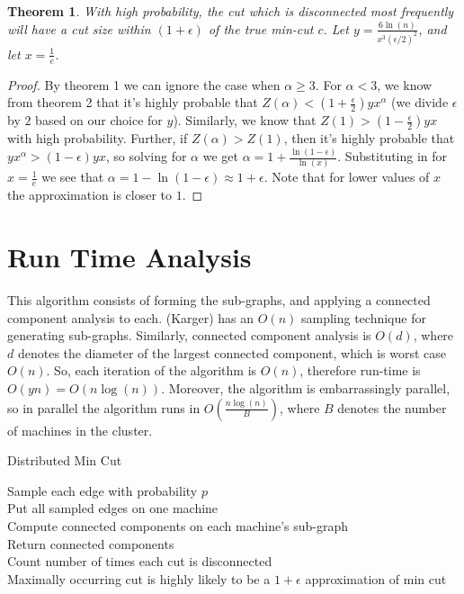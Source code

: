 \documentclass[12pt]{article}
\newtheorem{theorem}{Theorem}
\begin{document}
\begin{theorem}
With high probability, the cut which is disconnected most frequently will have a cut size within $(1+\epsilon)$ of the true min-cut $c$. Let $y = \frac{6 \ln(n)}{x^3 (\epsilon/2)^2}$, and let $x = \frac{1}{e}$.
\end{theorem}

\begin{proof}
By theorem 1 we can ignore the case when $\alpha \geq 3$. For $\alpha < 3$, we know from theorem 2 that it's highly probable that $Z(\alpha) < (1+\frac{\epsilon}{2})yx^\alpha$ (we divide $\epsilon$ by $2$ based on our choice for $y$).
Similarly, we know that $Z(1) > (1-\frac{\epsilon}{2}) yx$ with high probability. Further, if $Z(\alpha) > Z(1)$, then it's highly probable that $yx^\alpha > (1-\epsilon) yx$, so solving for $\alpha$ we get $\alpha = 1 + \frac{\ln(1-\epsilon)}{\ln(x)}$. Substituting in for $x = \frac{1}{e}$ we see that $\alpha = 1 - \ln(1 - \epsilon) \approx 1+\epsilon$. Note that for lower values of $x$ the approximation is closer to $1$.
\end{proof}

\section*{Run Time Analysis}

This algorithm consists of forming the sub-graphs, and applying a connected component analysis to each. (Karger) has an $O(n)$ sampling technique for generating sub-graphs. Similarly, connected component analysis is $O(d)$, where $d$ denotes the diameter of the largest connected component, which is worst case $O(n)$. So, each iteration of the algorithm is $O(n)$, therefore run-time is $O(yn) = O(n\log(n))$. Moreover, the algorithm is embarrassingly parallel, so in parallel the algorithm runs in $O(\frac{n \log(n)}{B})$, where $B$ denotes the number of machines in the cluster.

\LinesNumbered
\begin{algorithm}
\caption{Distributed Min Cut}
Sample each edge with probability $p$ \\
Put all sampled edges on one machine \\
\IP{}
{
  Compute connected components on each machine's sub-graph \\
  Return connected components \\
}
Count number of times each cut is disconnected \\
Maximally occurring cut is highly likely to be a $1+\epsilon$ approximation of min cut
\end{algorithm}
\end{document}
